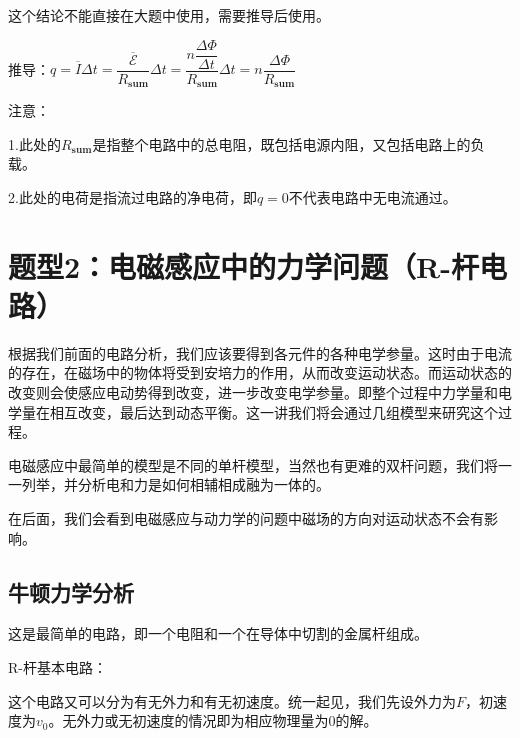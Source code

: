 \documentclass{ctexbook}
\begin{document}
	这个结论不能直接在大题中使用，需要推导后使用。
	
	推导：$q=\overline{I}\Delta t=\dfrac{\overline{\mathcal{E}}}{R_{\mathbf{sum}}}\Delta t=\dfrac{n \dfrac{ \Delta \varPhi}{\Delta t}}{R_{\mathbf{sum}}}\Delta t=n\dfrac{\Delta \varPhi}{R_{\mathbf{sum}}}$
	
	注意：
	
	1.此处的$R_{\mathbf{sum}}$是指整个电路中的总电阻，既包括电源内阻，又包括电路上的负载。
	
	2.此处的电荷是指流过电路的净电荷，即$q=0$不代表电路中无电流通过。
	
	\newpage
	
	\section{题型2：电磁感应中的力学问题（R-杆电路）}
	
	根据我们前面的电路分析，我们应该要得到各元件的各种电学参量。这时由于电流的存在，在磁场中的物体将受到安培力的作用，从而改变运动状态。而运动状态的改变则会使感应电动势得到改变，进一步改变电学参量。即整个过程中力学量和电学量在相互改变，最后达到动态平衡。这一讲我们将会通过几组模型来研究这个过程。
	
	电磁感应中最简单的模型是不同的单杆模型，当然也有更难的双杆问题，我们将一一列举，并分析电和力是如何相辅相成融为一体的。
	
	在后面，我们会看到电磁感应与动力学的问题中磁场的方向对运动状态不会有影响。
	
	\subsection{牛顿力学分析}
	
	这是最简单的电路，即一个电阻和一个在导体中切割的金属杆组成。
	
	R-杆基本电路：
	
	\hspace*{\fill}
	
	\hspace*{\fill}
	
	\hspace*{\fill}
	
	\hspace*{\fill}
	
	\hspace*{\fill}
	
	这个电路又可以分为有无外力和有无初速度。统一起见，我们先设外力为$F$，初速度为$v_0$。无外力或无初速度的情况即为相应物理量为0的解。
	
\end{document}
